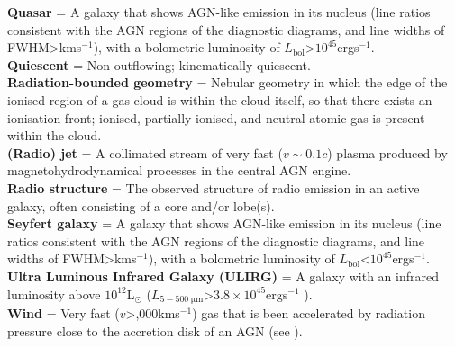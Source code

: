 \noindent
\textbf{Quasar} = A galaxy that shows AGN-like emission in its nucleus (line ratios consistent with the AGN regions of the \citealt{Baldwin1981} diagnostic diagrams, and line widths of FWHM\;\textgreater{}\;km\;s$^{-1}$), with a bolometric luminosity of $L_\mathrm{bol}$\;\textgreater\;$10^{45}$\;erg\;s$^{-1}$. \\

\noindent
\textbf{Quiescent} = Non-outflowing; kinematically-quiescent. \\

\noindent
\textbf{Radiation-bounded geometry} = Nebular geometry in which the edge of the ionised region of a gas cloud is within the cloud itself, so that there exists an ionisation front; ionised, partially-ionised, and neutral-atomic gas is present within the cloud. \\

\noindent
\textbf{(Radio) jet} = A collimated stream of very fast ($v\sim0.1c$) plasma produced by magnetohydrodynamical processes in the central AGN engine. \\

\noindent
\textbf{Radio structure} = The observed structure of radio emission in an active galaxy, often consisting of a core and/or lobe(s). \\

\noindent
\textbf{Seyfert galaxy} = A galaxy that shows AGN-like emission in its nucleus (line ratios consistent with the AGN regions of the \citealt{Baldwin1981} diagnostic diagrams, and line widths of FWHM\;\textgreater{}\;km\;s$^{-1}$), with a bolometric luminosity of $L_\mathrm{bol}$\;\textless\;$10^{45}$\;erg\;s$^{-1}$. \\


\noindent
\textbf{Ultra Luminous Infrared Galaxy (ULIRG)} = A galaxy with an infrared luminosity above $10^{12}$\;L$_\odot$ ($L_\mathrm{5-500\;\mu{m}}$\;\textgreater\;$3.8\times10^{45}$\;erg\;s$^{-1}$ \citealt{Sanders1996}). \\

\noindent
\textbf{Wind} = Very fast ($v$\;\textgreater{},000\;km\;s$^{-1}$) gas that is been accelerated by radiation pressure close to the accretion disk of an AGN (see \citealt{Hopkins2010}).